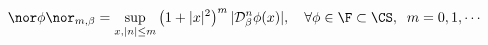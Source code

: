 \begin{equation}
\nor \phi \nor_{m, \beta } = \sup_{x, |n|\le m}       
	\left( 1+|x|^2 \right)^m |{\cal D}^n_\beta \phi (x) |, \quad           
		\forall \phi \in \F \subset \CS, \;\; m = 0,1,\cdots
\end{equation}

